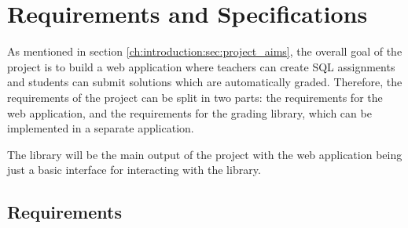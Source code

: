 \chapter{Requirements and Specifications} \label{ch:reqandspec}

As mentioned in section \ref{ch:introduction:sec:project_aims}, the overall goal of the project is to build a web application where teachers can create SQL assignments and students can submit solutions which are automatically graded. Therefore, the requirements of the project can be split in two parts: the requirements for the web application, and the requirements for the grading library, which can be implemented in a separate application. 

The library will be the main output of the project with the web application being just a basic interface for interacting with the library.

\section{Requirements} \label{ch:reqandspec:sec:rec}

